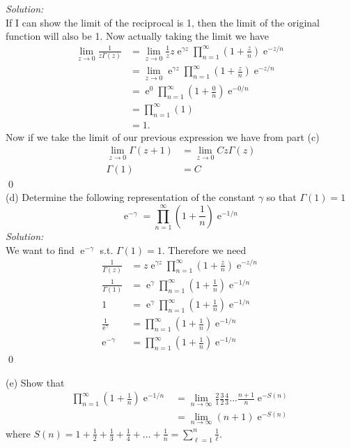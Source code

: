 \documentclass[10pt]{amsart}
\DeclareMathOperator{\E}{e}
\theoremstyle{nonumberplain}
\begin{document}
\begin{enumerate}[label={\bf {\arabic*}:}]
\noindent
\textit{Solution:} \\
If I can show the limit of the reciprocal is 1, then the limit of the original function will also be 1.
Now actually taking the limit we have
\begin{align*}
\lim_{z\rightarrow 0} \frac 1 {z \Gamma(z)}
	&= \lim_{z\rightarrow 0} \frac 1 z z \E^{\gamma z} \prod_{n=1}^\infty \left( 1 + \frac z n \right) \E^{-z / n} \\
	&= \lim_{z\rightarrow 0} \E^{\gamma z} \prod_{n=1}^\infty \left( 1 + \frac z n \right) \E^{-z / n} \\
	&= \E^{0} \prod_{n=1}^\infty \left( 1 + \frac 0 n \right) \E^{-0 / n} \\
	&= \prod_{n=1}^\infty \left( 1\right) \\
	&= 1.
\end{align*}
Now if we take the limit of our previous expression we have from part (c)
\begin{align*}
\lim_{z \rightarrow 0} \Gamma(z + 1) &= \lim_{z \rightarrow 0} Cz\Gamma(z) \\
\Gamma(1) &= C
\end{align*}
\qed \\

\noindent
(d) Determine the following representation of the constant $\gamma$ so that $\Gamma(1) = 1$
$$
\E^{-\gamma} = \prod_{n = 1}^\infty \left(1 + \frac 1 n\right)\E^{-1/n}
$$
\textit{Solution:} \\
We want to find $\E^{-\gamma}$ s.t. $\Gamma(1) = 1$.
Therefore we need
\begin{align*}
\frac 1 {\Gamma(z)} &= z \E^{\gamma z} \prod_{n=1}^\infty \left( 1 + \frac z n \right) \E^{-z / n} \\
\frac 1 {\Gamma(1)} &= \E^\gamma \prod_{n=1}^\infty \left( 1 + \frac 1 n \right) \E^{-1 / n} \\
1 &= \E^\gamma \prod_{n=1}^\infty \left( 1 + \frac 1 n \right) \E^{-1 / n} \\
\frac 1 {\E^\gamma} &= \prod_{n=1}^\infty \left( 1 + \frac 1 n \right) \E^{-1 / n} \\
\E^{-\gamma} &= \prod_{n=1}^\infty \left( 1 + \frac 1 n \right) \E^{-1 / n}
\end{align*}
\qed \\
\newpage

\noindent
(e) Show that
\begin{align*}
\prod_{n=1}^\infty \left(1 + \frac 1 n \right)\E^{-1/n}
	&= \lim_{n\rightarrow\infty} \frac 2 1 \frac 3 2 \frac 4 3 ... \frac {n + 1} n \E^{-S(n)} \\
	&= \lim_{n\rightarrow\infty} (n + 1) \E^{-S(n)}
\end{align*}
where $S(n) = 1 + \frac 1 2 + \frac 1 3 + \frac 1 4 + ... + \frac 1 n = \sum_{\ell=1}^n \frac 1 \ell$. \\


\end{enumerate}
\end{document}
